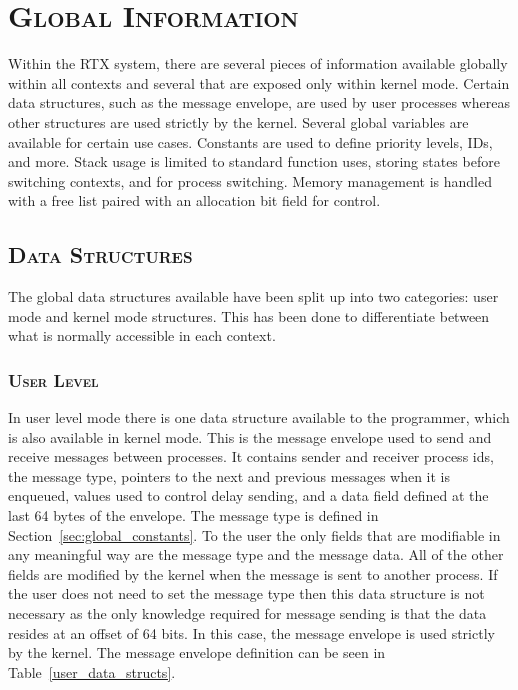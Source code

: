 \documentclass[oneside]{report}
\begin{document}
\begin{figure}[H]
    \label{flowchart}
\end{figure}

\pagebreak

\section{\textsc{Global Information}}
\label{sec:global_info}

Within the RTX system, there are several pieces of information
available globally within all contexts and several that are exposed
only within kernel mode. Certain data structures, such as the message
envelope, are used by user processes whereas other structures are used
strictly by the kernel. Several global variables are available for
certain use cases. Constants are used to define priority levels, IDs,
and more. Stack usage is limited to standard function uses, storing
states before switching contexts, and for process switching. Memory
management is handled with a free list paired with an allocation bit
field for control.

\subsection{\textsc{Data Structures}}
The global data structures available have been split up into two categories:
user mode and kernel mode structures. This has been done to differentiate
between what is normally accessible in each context.

\subsubsection{\textsc{User Level}}
In user level mode there is one data structure available to the programmer,
which is also available in kernel mode. This is the message envelope used to
send and receive messages between processes. It contains sender and receiver
process ids, the message type, pointers to the next and previous messages when
it is enqueued, values used to control delay sending, and a data field defined
at the last 64 bytes of the envelope. The message type is defined in
Section~\ref{sec:global_constants}. To the user the only fields that are
modifiable in any meaningful way are the message type and the message data. All
of the other fields are modified by the kernel when the message is sent to
another process. If the user does not need to set the message type then this
data structure is not necessary as the only knowledge required for message
sending is that the data resides at an offset of 64 bits. In this case, the
message envelope is used strictly by the kernel. The message envelope
definition can be seen in Table~\ref{user_data_structs}.
\end{document}
